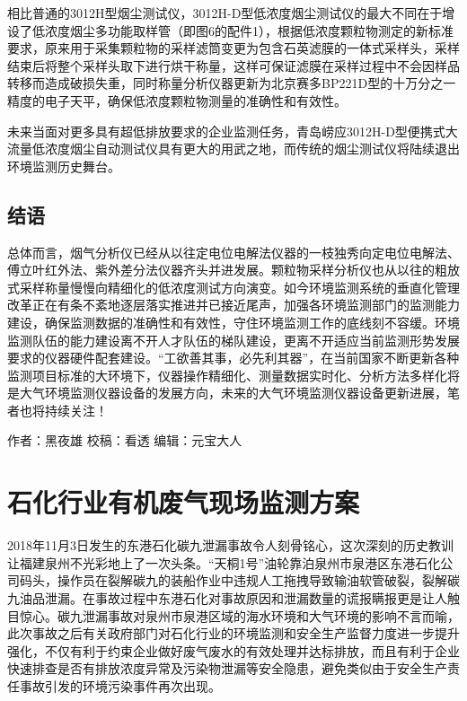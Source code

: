 \documentclass[
]{book}
\begin{document}
相比普通的3012H型烟尘测试仪，3012H-D型低浓度烟尘测试仪的最大不同在于增设了低浓度烟尘多功能取样管（即图6的配件1），根据低浓度颗粒物测定的新标准要求，原来用于采集颗粒物的采样滤筒变更为包含石英滤膜的一体式采样头，采样结束后将整个采样头取下进行烘干称量，这样可保证滤膜在采样过程中不会因样品转移而造成破损失重，同时称量分析仪器更新为北京赛多BP221D型的十万分之一精度的电子天平，确保低浓度颗粒物测量的准确性和有效性。

未来当面对更多具有超低排放要求的企业监测任务，青岛崂应3012H-D型便携式大流量低浓度烟尘自动测试仪具有更大的用武之地，而传统的烟尘测试仪将陆续退出环境监测历史舞台。

\hypertarget{ux7ed3ux8bed-13}{%
\subsection{结语}\label{ux7ed3ux8bed-13}}

总体而言，烟气分析仪已经从以往定电位电解法仪器的一枝独秀向定电位电解法、傅立叶红外法、紫外差分法仪器齐头并进发展。颗粒物采样分析仪也从以往的粗放式采样称量慢慢向精细化的低浓度测试方向演变。如今环境监测系统的垂直化管理改革正在有条不紊地逐层落实推进并已接近尾声，加强各环境监测部门的监测能力建设，确保监测数据的准确性和有效性，守住环境监测工作的底线刻不容缓。环境监测队伍的能力建设离不开人才队伍的梯队建设，更离不开适应当前监测形势发展要求的仪器硬件配套建设。``工欲善其事，必先利其器''，在当前国家不断更新各种监测项目标准的大环境下，仪器操作精细化、测量数据实时化、分析方法多样化将是大气环境监测仪器设备的发展方向，未来的大气环境监测仪器设备更新进展，笔者也将持续关注！

作者：黑夜雄
校稿：看透
编辑：元宝大人

\hypertarget{ux77f3ux5316ux884cux4e1aux6709ux673aux5e9fux6c14ux73b0ux573aux76d1ux6d4bux65b9ux6848}{%
\section{石化行业有机废气现场监测方案}\label{ux77f3ux5316ux884cux4e1aux6709ux673aux5e9fux6c14ux73b0ux573aux76d1ux6d4bux65b9ux6848}}

2018年11月3日发生的东港石化碳九泄漏事故令人刻骨铭心，这次深刻的历史教训让福建泉州不光彩地上了一次头条。``天桐1号''油轮靠泊泉州市泉港区东港石化公司码头，操作员在裂解碳九的装船作业中违规人工拖拽导致输油软管破裂，裂解碳九油品泄漏。在事故过程中东港石化对事故原因和泄漏数量的谎报瞒报更是让人触目惊心。碳九泄漏事故对泉州市泉港区域的海水环境和大气环境的影响不言而喻，此次事故之后有关政府部门对石化行业的环境监测和安全生产监督力度进一步提升强化，不仅有利于约束企业做好废气废水的有效处理并达标排放，而且有利于企业快速排查是否有排放浓度异常及污染物泄漏等安全隐患，避免类似由于安全生产责任事故引发的环境污染事件再次出现。
\end{document}
